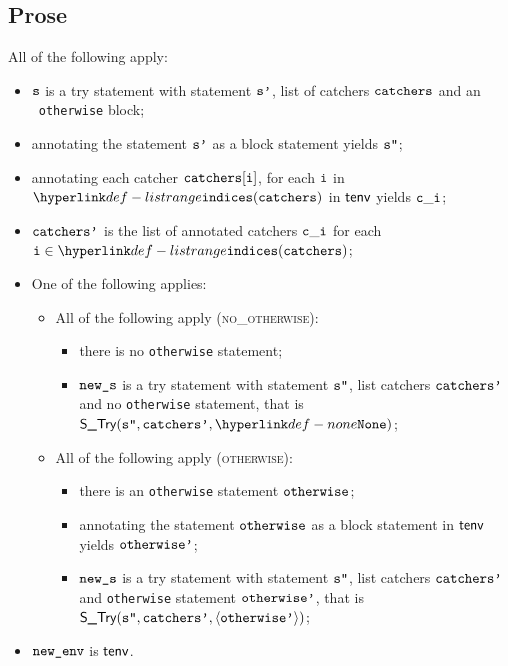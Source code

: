 \documentclass{book}
\newcommand\ProseOrTypeError[0]{\ProseTerminateAs{\TypeErrorConfig}}
\begin{document}
\subsection{Prose}
All of the following apply:
\begin{itemize}
  \item $\texttt{s}$ is a try statement with statement $\texttt{s'}$, list of catchers $\texttt{catchers}$ and an \optional\ \texttt{otherwise} block;
  \item annotating the statement $\texttt{s'}$ as a block statement yields $\texttt{s''}$\ProseOrTypeError;
  \item annotating each catcher $\texttt{catchers}[\texttt{i}]$, for each $\texttt{i}$ in $\listrange(\catchers)$ in $\textsf{tenv}$ yields $\texttt{c}\_\texttt{i}$\ProseOrTypeError;
  \item $\texttt{catchers'}$ is the list of annotated catchers $\texttt{c}\_\texttt{i}$ for each $\vi\in\listrange(\catchers)$;
  \item One of the following applies:
  \begin{itemize}
    \item All of the following apply (\textsc{no\_otherwise}):
    \begin{itemize}
      \item there is no \texttt{otherwise} statement;
      \item $\texttt{new\_s}$ is a try statement with statement $\texttt{s''}$, list catchers $\texttt{catchers'}$ and no \texttt{otherwise} statement,
            that is \\
            $\STry(\vspp, \catchersp, \None)$;
    \end{itemize}

    \item All of the following apply (\textsc{otherwise}):
    \begin{itemize}
      \item there is an \texttt{otherwise} statement $\texttt{otherwise}$;
      \item annotating the statement $\texttt{otherwise}$ as a block statement in $\textsf{tenv}$ yields $\texttt{otherwise'}$\ProseOrTypeError;
      \item $\texttt{new\_s}$ is a try statement with statement $\texttt{s''}$, list catchers $\texttt{catchers'}$ and \texttt{otherwise} statement
            $\texttt{otherwise'}$, that is \\
            $\textsf{S\_Try}(\texttt{s''}, \texttt{catchers'}, \langle\texttt{otherwise'}\rangle)$;
    \end{itemize}
  \end{itemize}
  \item $\texttt{new\_env}$ is $\textsf{tenv}$.
\end{itemize}
\end{document}
